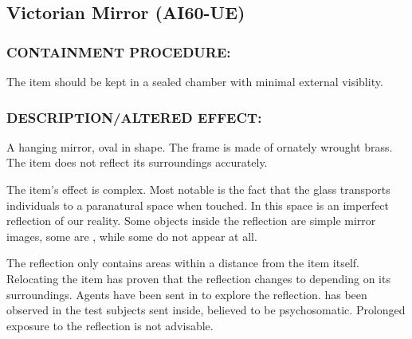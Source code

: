 \subsection*{Victorian Mirror (AI60-UE)}
\subsubsection*{CONTAINMENT PROCEDURE:}
\par The item should be kept in a sealed
chamber with minimal external visiblity.
\subsubsection*{DESCRIPTION/ALTERED EFFECT:}
\par A hanging mirror, oval in shape. The
frame is made of ornately wrought brass.
The item does not reflect its
surroundings accurately.
\par The item's effect is complex. Most notable is the fact that the
glass transports individuals to a paranatural space when touched.
In this space is an imperfect reflection of our reality. Some
objects inside the reflection are simple mirror images, some are  
, while some do not appear at all.
\par The reflection only contains areas within a 
distance from the item itself. Relocating the item has proven that the
reflection changes to depending on its surroundings. Agents have
been sent in to explore the reflection. 
has been observed in the test subjects sent inside, believed to be
psychosomatic. Prolonged exposure to the reflection is not
advisable.